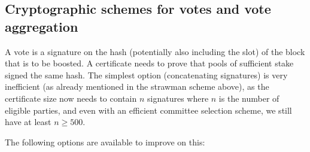 \subsection{Cryptographic schemes for votes and vote aggregation}\label{sec:crypto votes agg}

A vote is a signature on the hash (potentially also including the slot) of the block that is to be boosted.
A certificate needs to prove that pools of sufficient stake signed the same hash.
The simplest option (concatenating signatures) is very inefficient (as already mentioned in the strawman scheme above), as the certificate size now needs to contain $n$ signatures where $n$ is the number of eligible parties, and even with an efficient committee selection scheme, we still have at least $n\ge 500$.

The following options are available to improve on this:

